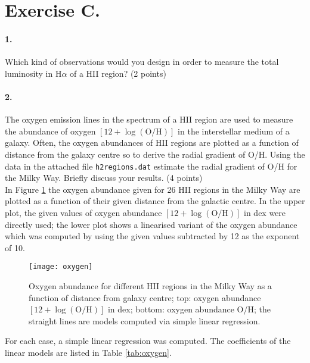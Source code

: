 \documentclass[11pt,a4paper,twoside]{article}
\begin{document}
\section*{Exercise C.}

\paragraph{1.} Which kind of observations would you design in order to measure
the total luminosity in $\text{H}\alpha$ of a HII region? (2 points) \\


\paragraph{2.} The oxygen emission lines in the spectrum of a HII region are
used to measure the abundance of oxygen $ \left[12 + \log{\left( \text{O/H}
\right)} \right]$ in the interstellar medium of a galaxy. Often, the oxygen
abundances of HII regions are plotted as a function of distance from the galaxy
centre so to derive the radial gradient of O/H. Using the data in the attached
file \verb+h2regions.dat+ estimate the radial gradient of O/H for the Milky
Way. Briefly discuss your results. (4 points) \\

In Figure \ref{fig:oxygen} the oxygen abundance given for \num{26} HII regions
in the Milky Way are plotted as a function of their given distance from the
galactic centre. In the upper plot, the given values of oxygen abundance $
\left[12 + \log{\left( \text{O/H} \right)} \right]$ in dex were directly used;
the lower plot shows a linearised variant of the oxygen abundance which was
computed by using the given values subtracted by \num{12} as the exponent of
\num{10}. \\

\begin{figure}[h!]
\centering
\texttt{[image: oxygen]}
\caption{Oxygen abundance for different HII regions in the Milky Way as a
function of distance from galaxy centre; top: oxygen abundance $ \left[12 +
\log{\left( \text{O/H} \right)} \right]$ in dex; bottom: oxygen abundance O/H;
the straight lines are models computed via simple linear regression.}
\label{fig:oxygen}
\end{figure}

For each case, a simple linear regression was computed. The coefficients of the linear models are listed in Table \ref{tab:oxygen}. 
\end{document}
